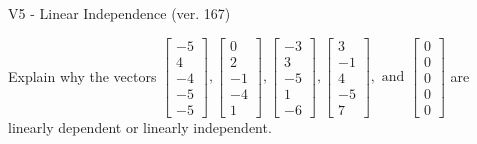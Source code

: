 \begin{exercise}
  \begin{exerciseTitle}V5 - Linear Independence (ver. 167)\end{exerciseTitle}
  \begin{exerciseStatement}
    Explain why the vectors \(\left[\begin{array}{r}
-5 \\
4 \\
-4 \\
-5 \\
-5
\end{array}\right] , \left[\begin{array}{r}
0 \\
2 \\
-1 \\
-4 \\
1
\end{array}\right] , \left[\begin{array}{r}
-3 \\
3 \\
-5 \\
1 \\
-6
\end{array}\right] , \left[\begin{array}{r}
3 \\
-1 \\
4 \\
-5 \\
7
\end{array}\right] , \text{ and } \left[\begin{array}{r}
0 \\
0 \\
0 \\
0 \\
0
\end{array}\right]\) are linearly dependent or linearly independent.	



\end{exerciseStatement}
\end{exercise}
